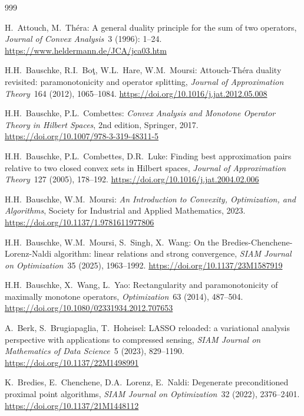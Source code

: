\documentclass{article}
\newcommand{\seppthree}{\setlength{\itemsep}{-3pt}}
\begin{document}
\begin{thebibliography}{999}
\seppthree


H.\ Attouch,  M.\ Th{\' e}ra:
A general duality principle for the sum of two operators,
\emph{Journal of Convex Analysis}~3 (1996): 1--24.
\url{https://www.heldermann.de/JCA/jca03.htm}

H.H.\ Bauschke, R.I.\ Bo\c{t}, W.L.\ Hare, W.M.\ Moursi:
Attouch-Th\'era duality revisited:
paramonotonicity and operator splitting,
\emph{Journal of Approximation Theory}~164 (2012), 1065--1084. 
\url{https://doi.org/10.1016/j.jat.2012.05.008}

H.H.\ Bauschke, P.L.\ Combettes: 
\emph{Convex Analysis and Monotone Operator Theory in Hilbert Spaces},
2nd edition, Springer, 2017.
\url{https://doi.org/10.1007/978-3-319-48311-5}


H.H.\ Bauschke, P.L.\ Combettes, D.R.\ Luke: 
Finding best approximation pairs relative to two closed convex sets in Hilbert spaces, 
\emph{Journal of Approximation Theory}~127 (2005), 178--192.
\url{https://doi.org/10.1016/j.jat.2004.02.006}


H.H.\ Bauschke, W.M.\ Moursi:
\emph{An Introduction to Convexity, Optimization, and Algorithms},
Society for Industrial and Applied Mathematics, 2023.
\url{https://doi.org/10.1137/1.9781611977806}


H.H.\ Bauschke, W.M.\ Moursi, S.\ Singh, X.\ Wang:
On the Bredies-Chenchene-Lorenz-Naldi algorithm: linear relations and strong convergence, 
\emph{SIAM Journal on Optimization}~35 (2025), 1963--1992. 
\url{https://doi.org/10.1137/23M1587919}

H.H.\ Bauschke, X.\ Wang, L.\ Yao:
Rectangularity and paramonotonicity of maximally monotone operators, 
\emph{Optimization}~63 (2014), 487--504.
\url{https://doi.org/10.1080/02331934.2012.707653}

A.\ Berk, S.\ Brugiapaglia, T.\ Hoheisel:
LASSO reloaded: a variational analysis perspective 
with applications to compressed sensing,
\emph{SIAM Journal on Mathematics of Data Science}~5 (2023), 829--1190.
\url{https://doi.org/10.1137/22M1498991}


K.\ Bredies, E.\ Chenchene, D.A.\ Lorenz, E.\ Naldi:
Degenerate preconditioned proximal point algorithms,
\emph{SIAM Journal on Optimization}~32 (2022), 2376--2401. 
\url{https://doi.org/10.1137/21M1448112}


\end{thebibliography}
\end{document}
